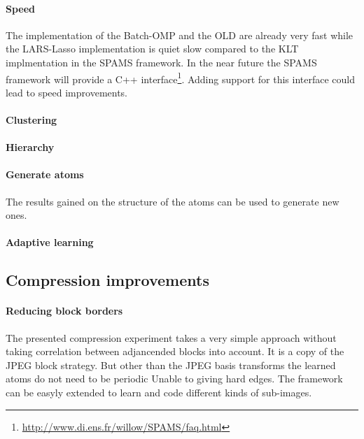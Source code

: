 \paragraph{Speed}
The implementation of the Batch-OMP and the OLD are already very fast while the
LARS-Lasso implementation is quiet slow compared to the KLT implmentation in the
SPAMS framework. In the near future the SPAMS framework will provide a C++
interface\footnote{\url{http://www.di.ens.fr/willow/SPAMS/faq.html}}. Adding
support for this interface could lead to speed improvements.

\paragraph{Clustering}
\paragraph{Hierarchy}
\paragraph{Generate atoms}
The results gained on the structure of the atoms can be used to generate new
ones.
\paragraph{Adaptive learning}


\subsection{Compression improvements}
\paragraph{Reducing block borders} The presented compression experiment
takes a very simple approach without taking correlation between adjancended
blocks into account. It is a copy of the JPEG block strategy. But other than
the JPEG basis transforms the learned atoms do not need to be periodic
Unable to giving
hard edges. The framework can be easyly extended to learn and code different
kinds of sub-images.

